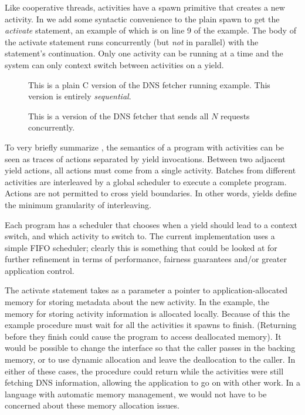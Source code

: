 \documentclass[a4paper,UKenglish,cleveref, autoref]{lipics-v2019}
\begin{document}
Like cooperative threads, activities have a spawn primitive that creates a new activity.
In \charcoal{} we add some syntactic convenience to the plain spawn to get the \emph{activate} statement, an example of which is on line 9 of the example.
The body of the activate statement runs concurrently (but \emph{not} in parallel) with the statement's continuation.
Only one activity can be running at a time and the system can only context switch between activities on a yield.

\begin{figure}
\caption{This is a plain C version of the DNS fetcher running example.
  This version is entirely \emph{sequential}.}
\label{fig:charcoal_multidns_seq}
\end{figure}

\begin{figure}
\caption{This is a \charcoal{} version of the DNS fetcher that sends all $N$ requests concurrently.}
\label{fig:charcoal_multidns_conc}
\end{figure}

To very briefly summarize \cite{Abadi2009}, the semantics of a program with activities can be seen as traces of actions separated by yield invocations.
Between two adjacent yield actions, all actions must come from a single activity.
Batches from different activities are interleaved by a global scheduler to execute a complete program.
Actions are not permitted to cross yield boundaries.
In other words, yields define the minimum granularity of interleaving.

Each \charcoal{} program has a scheduler that chooses when a yield should lead to a context switch, and which activity to switch to.
The current \charcoal{} implementation uses a simple FIFO scheduler; clearly this is something that could be looked at for further refinement in terms of performance, fairness guarantees and/or greater application control.

The activate statement takes as a parameter a pointer to application-allocated memory for storing metadata about the new activity.
In the example, the memory for storing activity information is allocated locally.
Because of this the example procedure must wait for all the activities it spawns to finish.
(Returning before they finish could cause the program to access deallocated memory).
It would be possible to change the interface so that the caller passes in the backing memory, or to use dynamic allocation and leave the deallocation to the caller.
In either of these cases, the procedure could return while the activities were still fetching DNS information, allowing the application to go on with other work.
In a language with automatic memory management, we would not have to be concerned about these memory allocation issues.
\end{document}

